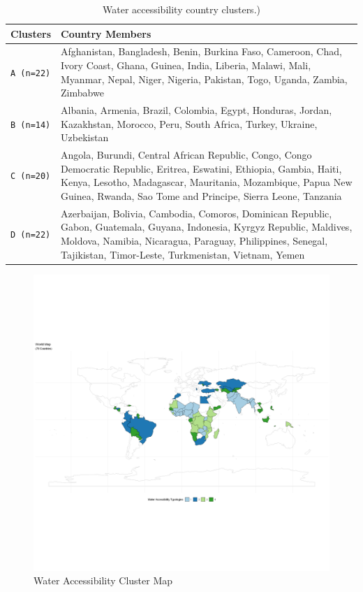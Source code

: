 \documentclass[10pt,twoside]{article}
\numberwithin{equation}{section}
\newcommand{\?}{\stackrel{?}{=}}
\begin{document}
  
\begin{table}[h!]
  \centering
  \begin{tabular}{p{1in} p{3in} }\toprule
    \bf Clusters & \bf Country Members \\\midrule
    \texttt{A (n=22)} & Afghanistan, Bangladesh, Benin, Burkina Faso, Cameroon, Chad, Ivory Coast, Ghana, Guinea, India, Liberia, Malawi, Mali, Myanmar, Nepal, Niger, Nigeria, Pakistan, Togo, Uganda, Zambia, Zimbabwe  \\\midrule
    \texttt{B (n=14)} & Albania, Armenia, Brazil, Colombia, Egypt, Honduras, Jordan, Kazakhstan, Morocco, Peru, South Africa, Turkey, Ukraine, Uzbekistan  \\\midrule
    \texttt{C (n=20)} & Angola, Burundi, Central African Republic, Congo, Congo Democratic Republic, Eritrea, Eswatini, Ethiopia, Gambia, Haiti, Kenya, Lesotho, Madagascar, Mauritania, Mozambique, Papua New Guinea, Rwanda, Sao Tome and Principe, Sierra Leone, Tanzania  \\\midrule
     \texttt{D (n=22)} & Azerbaijan, Bolivia, Cambodia, Comoros, Dominican Republic, Gabon, Guatemala, Guyana, Indonesia, Kyrgyz Republic, Maldives, Moldova, Namibia, Nicaragua, Paraguay, Philippines, Senegal, Tajikistan, Timor-Leste, Turkmenistan, Vietnam, Yemen  \\\bottomrule
  \end{tabular}
    \caption{Water accessibility country clusters.)}
  \label{tab:water-cluster}
\end{table}

\begin{figure}[h!]
  \centering
  \includegraphics[width=1\textwidth]{cluster-map}
  \caption{Water Accessibility Cluster Map}
  \label{fig:cluster-map}
\end{figure}
	
\end{document}

